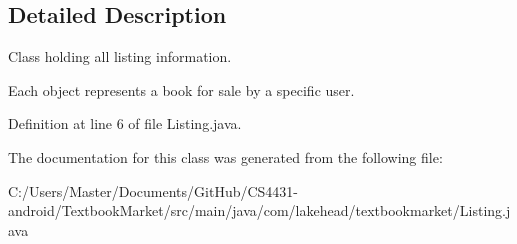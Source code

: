 \subsection{Detailed Description}
Class holding all listing information. 

Each object represents a book for sale by a specific user. 

Definition at line 6 of file Listing.\-java.



The documentation for this class was generated from the following file\-:\begin{DoxyCompactItemize}
\item 
C\-:/\-Users/\-Master/\-Documents/\-Git\-Hub/\-C\-S4431-\/android/\-Textbook\-Market/src/main/java/com/lakehead/textbookmarket/Listing.\-java\end{DoxyCompactItemize}

